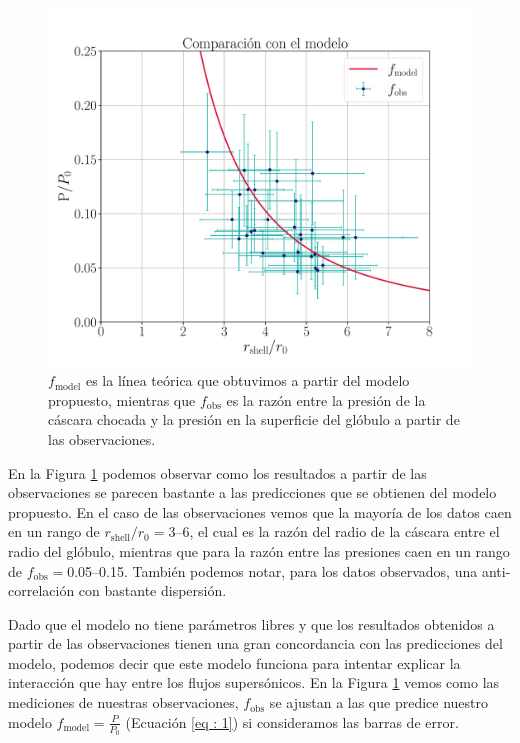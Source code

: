 \documentclass{book}
\begin{document}
\begin{figure}[htb]
    \centering
    \includegraphics[width=\textwidth]{imagenes_corregidas/Model.pdf}
    \caption{$f_\mathrm{model}$ es la línea teórica que obtuvimos a partir del modelo propuesto, mientras que $f_\mathrm{obs}$ es la razón entre la presión de la cáscara chocada  y la presión en la superficie del glóbulo a partir de las observaciones.}
    \label{Resultados_modelo}
\end{figure}

En la Figura \ref{Resultados_modelo} podemos observar como los
resultados a partir de las observaciones se parecen bastante a las
predicciones que se obtienen del modelo propuesto. En el caso de las
observaciones vemos que la mayoría de los datos caen en un rango de
$r_\mathrm{shell}/r_0=$3--6, el cual es la razón del radio de la
cáscara entre el radio del glóbulo, mientras que para la razón entre
las presiones caen en un rango de $f_\mathrm{obs}=$0.05--0.15. También
podemos notar, para los datos observados, una anti-correlación con
bastante dispersión.

Dado que el modelo no tiene parámetros libres y que los resultados
obtenidos a partir de las observaciones tienen una gran concordancia
con las predicciones del modelo, podemos decir que este modelo
funciona para intentar explicar la interacción que hay entre los
flujos supersónicos. En la Figura \ref{Resultados_modelo} vemos como
las mediciones de nuestras observaciones, $f_\mathrm{obs}$ se ajustan
a las que predice nuestro modelo $f_\mathrm{model}=\frac{P}{P_0}$
(Ecuación \ref{eq : 1}) si consideramos las barras de error.
\end{document}
